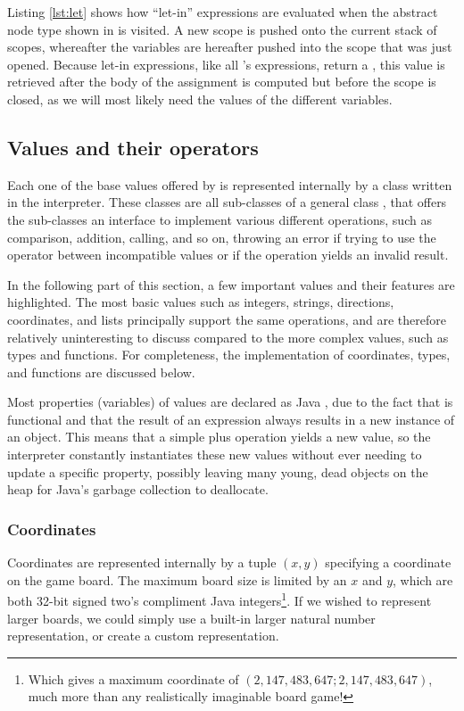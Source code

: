 

Listing \ref{lst:let} shows how ``let-in'' expressions are evaluated
when the abstract node type shown in  is
visited. A new scope is pushed onto the current stack of scopes,
whereafter the variables are hereafter pushed into the scope that was
just opened. Because let-in expressions, like all \productname{}'s
expressions, return a , this value is retrieved after
the body of the assignment is computed but before the scope is closed,
as we will most likely need the values of the different variables.

\subsection{Values and their operators}
Each one of the base values offered by \productname{} is represented
internally by a class written in the interpreter. These classes are
all sub-classes of a general class , that offers the
sub-classes an interface to implement various different operations, such
as comparison, addition, calling, and so on, throwing an error if trying
to use the operator between incompatible values or if the operation
yields an invalid result.

In the following part of this section, a few important values and their
features are highlighted. The most basic values such as integers,
strings, directions, coordinates, and lists principally support the
same operations, and are therefore relatively uninteresting to discuss
compared to the more complex values, such as types and functions. For
completeness, the implementation of coordinates, types, and
functions are discussed below.

Most properties (variables) of values are declared as Java
, due to the fact that \productname{} is functional and
that the result of an expression always results in a new instance of an
object. This means that a simple plus operation yields a new value, so
the interpreter constantly instantiates these new values without ever
needing to update a specific property, possibly leaving many young, dead
objects on the heap for Java's garbage collection to deallocate.

\subsubsection{Coordinates}
Coordinates are represented internally by a tuple $(x, y)$ specifying
a coordinate on the game board. The maximum board size is limited by
an $x$ and $y$, which are both 32-bit signed two's compliment Java
integers\footnote{Which gives a maximum coordinate of $(2,147,483,647;
2,147,483,647)$, much more than any realistically imaginable board
game!}. If we wished to represent larger boards, we could simply use
a built-in larger natural number representation, or create a custom
representation.

